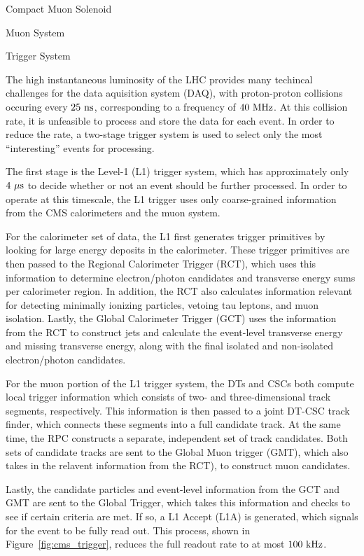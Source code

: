 \begin{section}{Compact Muon Solenoid}
\begin{subsection}{Muon System}
\end{subsection}

\begin{subsection}{Trigger System}

The high instantaneous luminosity of the LHC provides many techincal challenges for the data aquisition system (DAQ), with proton-proton collisions occuring every $25~\mathrm{ns}$, corresponding to a frequency of $40~\mathrm{MHz}$. 
At this collision rate, it is unfeasible to process and store the data for each event.
In order to reduce the rate, a two-stage trigger system is used to select only the most ``interesting'' events for processing.

The first stage is the Level-1 (L1) trigger system, which has approximately only $4~\mu\mathrm{s}$ to decide whether or not an event should be further processed. 
In order to operate at this timescale, the L1 trigger uses only coarse-grained information from the CMS calorimeters and the muon system.

For the calorimeter set of data, the L1 first generates trigger primitives by looking for large energy deposits in the calorimeter.
These trigger primitives are then passed to the Regional Calorimeter Trigger (RCT), which uses this information to determine electron/photon candidates and transverse energy sums per calorimeter region.
In addition, the RCT also calculates information relevant for detecting minimally ionizing particles, vetoing tau leptons, and muon isolation.
Lastly, the Global Calorimeter Trigger (GCT) uses the information from the RCT to construct jets and calculate the event-level transverse energy and missing transverse energy, along with the final isolated and non-isolated electron/photon candidates.

For the muon portion of the L1 trigger system, the DTs and CSCs both compute local trigger information which consists of two- and three-dimensional track segments, respectively.
This information is then passed to a joint DT-CSC track finder, which connects these segments into a full candidate track.
At the same time, the RPC constructs a separate, independent set of track candidates.
Both sets of candidate tracks are sent to the Global Muon trigger (GMT), which also takes in the relavent information from the RCT), to construct muon candidates.

Lastly, the candidate particles and event-level information from the GCT and GMT are sent to the Global Trigger, which takes this information and checks to see if certain criteria are met.
If so, a L1 Accept (L1A) is generated, which signals for the event to be fully read out.
This process, shown in Figure~\ref{fig:cms_trigger}, reduces the full readout rate to at most $100~\mathrm{kHz}$.


\end{subsection}
\end{section}
